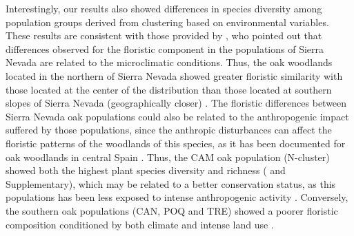 Interestingly, our results also showed differences in species diversity among population groups derived from clustering based on environmental variables. These results are consistent with those provided by \textcite{Loriteetal2008PhytosociologicalReview}, who pointed out that differences observed for the floristic component in the \Qp populations of Sierra Nevada are related to the microclimatic conditions. Thus, the oak woodlands located in the northern of Sierra Nevada showed greater floristic similarity with those located at the center of the \Qp distribution than those located at southern slopes of Sierra Nevada (geographically closer) \autocite{Loriteetal2008PhytosociologicalReview}. The floristic differences between Sierra Nevada oak populations could also be related to the anthropogenic impact suffered by those populations, since the anthropic disturbances can affect the floristic patterns of the woodlands of this species, as it has been documented for oak woodlands in central Spain \autocite{Gavilanetal2000EffectsDisturbance}. Thus, the CAM oak population (N-cluster) showed both the highest plant species diversity and richness ( and Supplementary), which may be related to a better conservation status, as this populations has been less exposed to intense anthropogenic activity \autocite{JimenezOlivencia1991PaisajesSierra}. Conversely, the southern oak populations (CAN, POQ and TRE) showed a poorer floristic composition conditioned by both climate and intense land use \autocite{CamachoOlmedoetal2002DinamicaEvolutiva,AlAallalietal1998EstudioVegetacion}.

